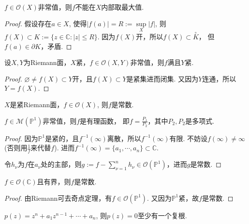 \begin{corollary}[最大模]
    $f\in \mathcal{O}(X)$非常值，则$f$不能在$X$内部取最大值.
\end{corollary}
\begin{proof}
    假设存在$a\in X$, 使得$|f(a)|=R:=\sup\limits_X |f|$, 
    则$f(X)\subset K:=\{z\in \mathbb{C}:|z|\leq R\}$. 
    因为$f(X)$开，所以$f(X)\subset \overset{\circ}{K}$，
    但$f(a)\in \partial K$，矛盾.
\end{proof}

\begin{theorem}
	设$X, Y$为Riemann面，$X$紧，$f\in \mathcal{O}(X,Y)$非常值，则$f$满且$Y$紧.
\end{theorem}

\begin{proof}
	$\varnothing \neq f(X)\subset Y$开，且$f(X)\subset Y$是紧集进而闭集. 
    又因为$Y$连通，所以$Y=f(X)$.
\end{proof}
		
\begin{corollary}
	$X$是紧Riemann面，$f\in \mathcal{O}(X)$, 则$f$是常数.
\end{corollary}
		
\begin{corollary}
	$f\in \mathscr{M}(\mathbb{P}^1)$非常值，则$f$是有理函数，
    即$f=\frac{P_1}{P_2}$，其中$P_2, P_2$是多项式.
\end{corollary}
	
\begin{proof}
	因为$\mathbb{P}^1$是紧的，且$f^{-1}(\infty)$离散，所以$f^{-1}(\infty)$有限. 
    不妨设$f(\infty)\neq \infty$ (否则用$\frac{1}{f}$来代替$f$). 
    进而$f^{-1}(\infty)=\{a_1,\cdots,a_n\}\subset \mathbb{C}$.

	令$h_\nu$为$f$在$a_\nu$处的主部，则$g:=f-\sum\limits_{\nu=1}^{n} h_\nu\in \mathcal{O}(\mathbb{P}^1)$，进而$g$是常数.
\end{proof}
	
\begin{corollary}[Liouville定理]
    $f\in \mathcal{O}(\mathbb{C})$且有界，则$f$是常数.
\end{corollary}
		
\begin{proof}
	由Riemann可去奇点定理，有$f\in \mathcal{O}(\mathbb{P}^1)$. 
    又因为$\mathbb{P}^1$紧，故$f$是常数.
\end{proof}
	
\begin{corollary}[代数学基本定理]
    $p(z)=z^n+a_1z^{n-1}+\cdots+a_n$, 则$p(z)=0$至少有一个复根.
\end{corollary}
		
